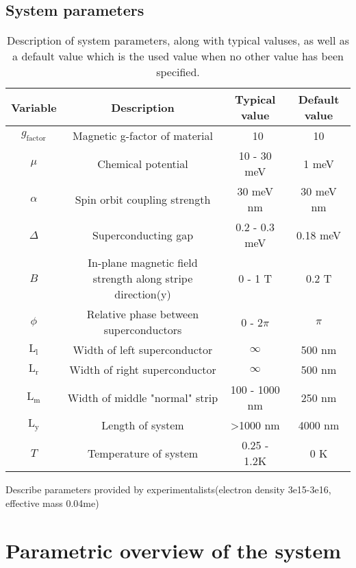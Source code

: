 \documentclass[10pt,a4paper]{article}
\begin{document}
	\subsection{System parameters}
	\begin{table}
		\begin{tabular}{|c|c|c|c|}
			\hline 
			Variable & Description & Typical value & Default value \\ 
			\hline 
			$g_\text{factor}$ & Magnetic g-factor of material & ~10 & 10 \\ 
			\hline 
			$\mu$ & Chemical potential &  10 - 30 meV & 1 meV\\ 
			\hline 
			$\alpha$ & Spin orbit coupling strength &  30 meV nm & 30 meV nm \\ 
			\hline 
			$\Delta$ & Superconducting gap & 0.2 - 0.3 meV & 0.18 meV\\ 
			\hline 
			$B$ & In-plane magnetic field strength along stripe direction(y) & 0 - 1 T & 0.2 T \\ 
			\hline 
			$\phi$ & Relative phase between superconductors &  0 - 2$\pi$ & $\pi$\\ 
			\hline 
			$\text{L}_\text{l}$ & Width of left superconductor & $\infty$ & 500 nm \\
			\hline 
			$\text{L}_\text{r}$ & Width of right superconductor & $\infty$ & 500 nm \\
			\hline
			$\text{L}_\text{m}$ & Width of middle "normal" strip & 100 - 1000 nm & 250 nm \\
			\hline
			$\text{L}_\text{y}$ & Length of system & \textgreater1000 nm & 4000 nm\\
			\hline
			$T$ & Temperature of system & 0.25 - 1.2K & 0 K\\
			\hline
		\end{tabular} 
	\caption{Description of system parameters, along with typical valuses, as well as a default value which is the used value when no other value has been specified.}
	\label{tbl:system_pars}
	\end{table}
	Describe parameters provided by experimentalists(electron density 3e15-3e16, effective mass 0.04me)
\section{Parametric overview of the system}
\end{document}
